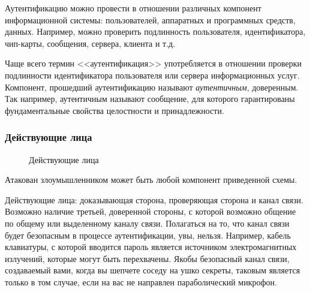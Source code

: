Аутентификацию можно провести в отношении различных компонент информационной системы: пользователей, аппаратных и программных средств, данных. Например, можно проверить подлинность пользователя, идентификатора, чип-карты, сообщения, сервера, клиента и т.д.

Чаще всего термин <<аутентификация>> употребляется в отношении проверки подлинности идентификатора пользователя или сервера информационных услуг. Компонент, прошедший аутентификацию называют \emph{аутентичным}, доверенным. Так например, аутентичным называют сообщение, для которого гарантированы фундаментальные свойства целостности и принадлежности.


\begin{frame}
\frametitle{Действующие лица}
\begin{figure}
    \begin{center}
    \end{center}
    \caption{Действующие лица}\label{pict:actors}
\end{figure} 
Атакован злоумышленником может быть любой компонент приведенной схемы. 
\end{frame}


Действующие лица: доказывающая сторона, проверяющая сторона и канал связи. Возможно наличие третьей, доверенной стороны, с которой возможно общение по общему или выделенному каналу связи. Полагаться на то, что канал связи будет безопасным в процессе аутентификации, увы, нельзя. Например, кабель клавиатуры, с которой вводится пароль является источником электромагнитных излучений, которые могут быть перехвачены. Якобы безопасный канал связи, создаваемый вами, когда вы шепчете соседу на ушко секреты, таковым является только в том случае, если на вас не направлен параболический микрофон.


